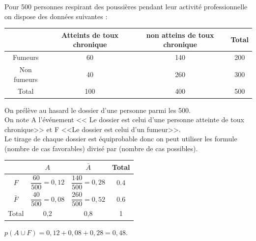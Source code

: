 \documentclass[12pt,a4paper]{article}
\begin{document}
\begin{myex}
	Pour 500 personnes respirant des poussières pendant leur activité professionnelle on dispose des données suivantes :
	
	\begin{small}
		\begin{tabular}{@{\ }c@{\ }|@{\ }c@{\ }|@{\ }c@{\ }|@{\ }c@{\ }|}
			\cline{2-4}
			& Atteints de toux chronique & non atteins de toux chronique & Total \\ \hline
			\multicolumn{1}{|c|}{Fumeurs}     & 60                         & 140                           & 200   \\ \hline
			\multicolumn{1}{|c|}{Non fumeurs} & 40                         & 260                           & 300   \\ \hline
			\multicolumn{1}{|c|}{Total}       & 100                        & 400                           & 500   \\ \hline
		\end{tabular}
	\end{small}
	
	\vspace*{0.5cm}
	
	
	On prélève au hasard le dossier d'une personne parmi les 500.\\
	
	
	On note A l'événement << Le dossier est celui d'une personne atteinte de toux chronique>> et F <<Le dossier est celui d'un fumeur>>.\\
	
	Le tirage de  chaque dossier est équiprobable donc on peut utiliser les formule (nombre de cas favorables) divisé par (nombre de cas possibles).
	
	\begin{small}
		
		\renewcommand{\arraystretch}{2}
		\begin{tabular}{c|c|c|c|}
			\cline{2-4}
			& $A$                      & $\bar{A} $              & Total \\ \hline
			\multicolumn{1}{|c|}{$F$}         & $\dfrac{60}{500}=0,12$ & $\dfrac{140}{500}=0,28$ & 0.4   \\ \hline
			\multicolumn{1}{|c|}{$\bar{F}$} & $\dfrac{40}{500}=0,08$ & $\dfrac{260}{500}=0,52$ & 0.6   \\ \hline
			\multicolumn{1}{|c|}{Total}     & 0,2                    & 0,8                     & 1     \\ \hline
		\end{tabular}
	\end{small}
	
	$p(A \cup F) = 0,12 + 0,08 + 0,28 = 0,48.$
\end{myex}

	
	
	
\end{document}
